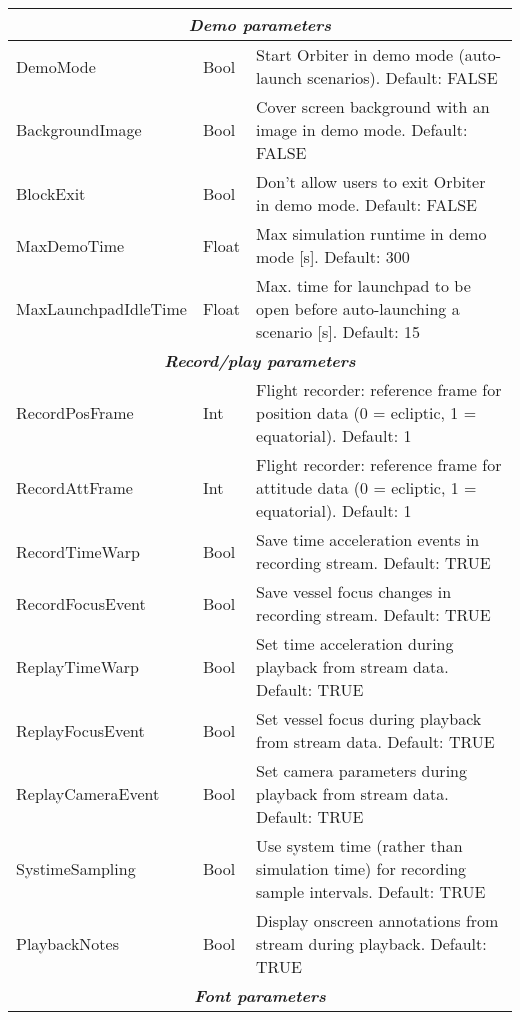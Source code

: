 \documentclass[Orbiter User Manual.tex]{subfiles}
\begin{document}
\begin{longtable}{ |p{}|p{}|p{}| }
	\hline
	\multicolumn{3}{|c|}{\rule{0pt}{2ex}\textbf{\textit{Demo parameters}}}\\
	\hline\rule{0pt}{2ex}
	DemoMode & Bool & Start Orbiter in demo mode (auto-launch scenarios). Default: FALSE\\
	\hline\rule{0pt}{2ex}
	BackgroundImage & Bool & Cover screen background with an image in demo mode. Default: FALSE\\
	\hline\rule{0pt}{2ex}
	BlockExit & Bool & Don't allow users to exit Orbiter in demo mode. Default: FALSE\\
	\hline\rule{0pt}{2ex}
	MaxDemoTime & Float & Max simulation runtime in demo mode [s]. Default: 300\\
	\hline\rule{0pt}{2ex}
	MaxLaunchpadIdleTime & Float & Max. time for launchpad to be open before auto-launching a scenario [s]. Default: 15\\
	\hline
	\multicolumn{3}{|c|}{\rule{0pt}{2ex}\textbf{\textit{Record/play parameters}}}\\
	\hline\rule{0pt}{2ex}
	RecordPosFrame & Int & Flight recorder: reference frame for position data (0 = ecliptic, 1 = equatorial). Default: 1\\
	\hline\rule{0pt}{2ex}
	RecordAttFrame & Int & Flight recorder: reference frame for attitude data (0 = ecliptic, 1 = equatorial). Default: 1\\
	\hline\rule{0pt}{2ex}
	RecordTimeWarp & Bool & Save time acceleration events in recording stream. Default: TRUE\\
	\hline\rule{0pt}{2ex}
	RecordFocusEvent & Bool & Save vessel focus changes in recording stream. Default: TRUE\\
	\hline\rule{0pt}{2ex}
	ReplayTimeWarp & Bool & Set time acceleration during playback from stream data. Default: TRUE\\
	\hline\rule{0pt}{2ex}
	ReplayFocusEvent & Bool & Set vessel focus during playback from stream data. Default: TRUE\\
	\hline\rule{0pt}{2ex}
	ReplayCameraEvent & Bool & Set camera parameters during playback from stream data. Default: TRUE\\
	\hline\rule{0pt}{2ex}
	SystimeSampling & Bool & Use system time (rather than simulation time) for recording sample intervals. Default: TRUE\\
	\hline\rule{0pt}{2ex}
	PlaybackNotes & Bool & Display onscreen annotations from stream during playback. Default: TRUE\\
	\hline
	\multicolumn{3}{|c|}{\rule{0pt}{2ex}\textbf{\textit{Font parameters}}}\\

\end{longtable}
\end{document}
